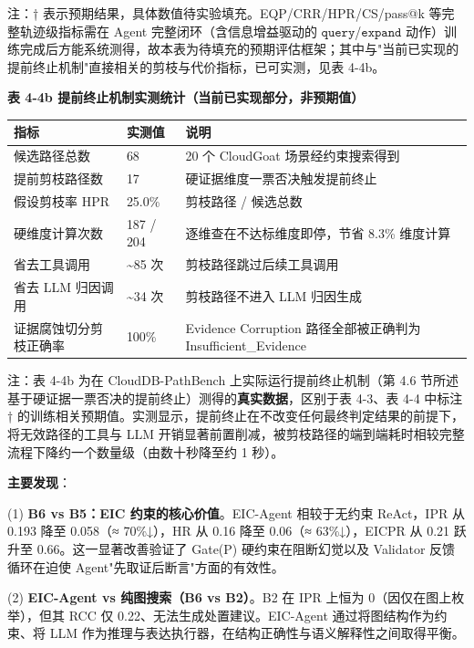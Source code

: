 \documentclass[a4paper,12pt]{ctexart}
\begin{document}
注：† 表示预期结果，具体数值待实验填充。EQP/CRR/HPR/CS/pass@k 等完整轨迹级指标需在 Agent 完整闭环（含信息增益驱动的 $\texttt{query}$/$\texttt{expand}$ 动作）训练完成后方能系统测得，故本表为待填充的预期评估框架；其中与"当前已实现的提前终止机制"直接相关的剪枝与代价指标，已可实测，见表 4-4b。

\textbf{表 4-4b 提前终止机制实测统计（当前已实现部分，非预期值）}

\begin{table}[htbp]
\centering
\small
\setlength{\tabcolsep}{4pt}
\begin{tabular}{|l|l|l|}
\hline
\textbf{指标} & \textbf{实测值} & \textbf{说明} \\
\hline
候选路径总数 & 68 & 20 个 CloudGoat 场景经约束搜索得到 \\
\hline
提前剪枝路径数 & 17 & 硬证据维度一票否决触发提前终止 \\
\hline
假设剪枝率 HPR & 25.0\% & 剪枝路径 / 候选总数 \\
\hline
硬维度计算次数 & 187 / 204 & 逐维查在不达标维度即停，节省 8.3\% 维度计算 \\
\hline
省去工具调用 & \textasciitilde{}85 次 & 剪枝路径跳过后续工具调用 \\
\hline
省去 LLM 归因调用 & \textasciitilde{}34 次 & 剪枝路径不进入 LLM 归因生成 \\
\hline
证据腐蚀切分剪枝正确率 & 100\% & Evidence Corruption 路径全部被正确判为 Insufficient\_Evidence \\
\hline
\end{tabular}
\end{table}

注：表 4-4b 为在 CloudDB-PathBench 上实际运行提前终止机制（第 4.6 节所述基于硬证据一票否决的提前终止）测得的\textbf{真实数据}，区别于表 4-3、表 4-4 中标注 † 的训练相关预期值。实测显示，提前终止在不改变任何最终判定结果的前提下，将无效路径的工具与 LLM 开销显著前置削减，被剪枝路径的端到端耗时相较完整流程下降约一个数量级（由数十秒降至约 1 秒）。

\textbf{主要发现}：

(1) \textbf{B6 vs B5：EIC 约束的核心价值}。EIC-Agent 相较于无约束 ReAct，IPR 从 0.193 降至 0.058（≈ 70\%↓），HR 从 0.16 降至 0.06（≈ 63\%↓），EICPR 从 0.21 跃升至 0.66。这一显著改善验证了 Gate(P) 硬约束在阻断幻觉以及 Validator 反馈循环在迫使 Agent"先取证后断言"方面的有效性。

(2) \textbf{EIC-Agent vs 纯图搜索（B6 vs B2）}。B2 在 IPR 上恒为 0（因仅在图上枚举），但其 RCC 仅 0.22、无法生成处置建议。EIC-Agent 通过将图结构作为约束、将 LLM 作为推理与表达执行器，在结构正确性与语义解释性之间取得平衡。
\end{document}
